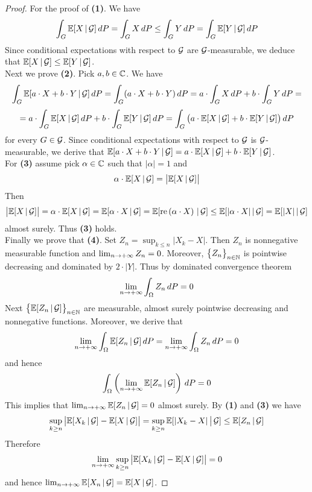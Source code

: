 \begin{proof}
For the proof of \textbf{(1)}. We have 
$$\int_G{\mathbb E}[X\,|\,{\mathcal G}]\,dP = \int_GX\,dP \leq \int_GY\,dP = \int_G{\mathbb E}[Y\,|\,{\mathcal G}]\,dP$$
Since conditional expectations with respect to ${\mathcal G}$ are ${\mathcal G}$-measurable, we deduce that ${\mathbb E}[X\,|\,{\mathcal G}] \leq {\mathbb E}[Y\,|\,{\mathcal G}]$.\\
Next we prove \textbf{(2)}. Pick $a, b\in {\mathbb C}$. We have
$$\int_G{\mathbb E}[a\cdot X+b\cdot Y\,|\,{\mathcal G}]\,dP = \int_G(a\cdot X+b\cdot Y)\,dP = a\cdot \int_GX\,dP+b\cdot \int_GY\,dP =$$
$$= a\cdot \int_G{\mathbb E}[X\,|\,{\mathcal G}]\,dP+b\cdot \int_G{\mathbb E}[Y\,|\,{\mathcal G}]\,dP =\int_G\big(a\cdot {\mathbb E}[X\,|\,{\mathcal G}]+b\cdot {\mathbb E}[Y\,|\,{\mathcal G}]\big)\,dP$$
for every $G\in {\mathcal G}$. Since conditional expectations with respect to ${\mathcal G}$ is ${\mathcal G}$-measurable, we derive that ${\mathbb E}[a\cdot X+b\cdot Y\,|\,{\mathcal G}] = a\cdot {\mathbb E}[X\,|\,{\mathcal G}]+b\cdot {\mathbb E}[Y\,|\,{\mathcal G}]$.\\
For \textbf{(3)} assume pick $\alpha \in {\mathbb C}$ such that $|\alpha| = 1$ and
$$\alpha \cdot {\mathbb E}[X\,|\,{\mathcal G}] = \big|{\mathbb E}[X\,|\,{\mathcal G}]\big|$$
Then
$$\big|{\mathbb E}[X\,|\,{\mathcal G}]\big| = \alpha \cdot {\mathbb E}[X\,|\,{\mathcal G}] = {\mathbb E}[\alpha \cdot X\,|\,{\mathcal G}] =  {\mathbb E}[\mathrm{re}\left(\alpha \cdot X\right)\,|\,{\mathcal G}] \leq {\mathbb E}[|\alpha \cdot X|\,|\,{\mathcal G}] = {\mathbb E}[|X|\,|\,{\mathcal G}]$$
almost surely. Thus \textbf{(3)} holds.\\
Finally we prove that \textbf{(4)}. Set $Z_n = \sup_{k\leq n}|X_k-X|$. Then $Z_n$ is nonnegative measurable function and $\lim_{n\rightarrow +\infty}Z_n = 0$. Moreover, $\big\{Z_n\big\}_{n\in {\mathbb N}}$ is pointwise decreasing and dominated by $2\cdot |Y|$. Thus by dominated convergence theorem
$$\lim_{n\rightarrow +\infty}\int_{\Omega} Z_n \,dP= 0$$
Next $\big\{{\mathbb E}[Z_n\,|\,{\mathcal G}]\big\}_{n\in {\mathbb N}}$ are measurable, almost surely pointwise decreasing and nonnegative functions. Moreover, we derive that
$$\lim_{n\rightarrow +\infty}\int_{\Omega} {\mathbb E}[Z_n\,|\,{\mathcal G}]\,dP =\lim_{n\rightarrow +\infty}\int_{\Omega} Z_n\,dP = 0$$
and hence 
$$\int_{\Omega} \left(\lim_{n\rightarrow +\infty}{\mathbb E}[Z_n\,|\,{\mathcal G}]\right)\,dP = 0$$
This implies that $\lim_{n\rightarrow +\infty}{\mathbb E}[Z_n\,|\,{\mathcal G}]=0$ almost surely. By \textbf{(1)} and \textbf{(3)} we have
$$\sup_{k\geq n}\big|{\mathbb E}[X_k\,|\,{\mathcal G}]-{\mathbb E}[X\,|\,{\mathcal G}]\big|= \sup_{k\geq n}{\mathbb E}[|X_k-X|\,\big|\,{\mathcal G}] \leq {\mathbb E}[Z_n\,|\,{\mathcal G}] $$
Therefore
$$\lim_{n\rightarrow +\infty}\sup_{k\geq n}\big|{\mathbb E}[X_k\,|\,{\mathcal G}]-{\mathbb E}[X\,|\,{\mathcal G}]\big| = 0$$
and hence $\lim_{n\rightarrow +\infty}{\mathbb E}[X_n\,|\,{\mathcal G}] = {\mathbb E}[X\,|\,{\mathcal G}]$.
\end{proof}

